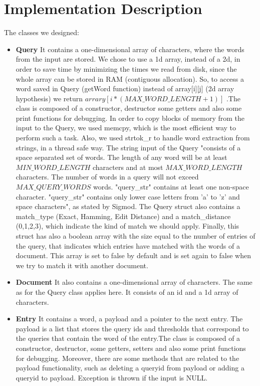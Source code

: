 \documentclass{article}
\begin{document}
\section{Implementation Description}
The classes we designed:
\begin{itemize}
  \item \textbf{Query}
  It contains a one-dimensional array of characters, where the words from the input are stored. We chose to use a 1d array, instead of a 2d, in order to save time by minimizing the times we read from disk, since the whole array can be stored in RAM (contiguous allocation). So, to access a word saved in Query (getWord function) instead of array[i][j] (2d array hypothesis) we return $arrary[i*(MAX\_WORD\_LENGTH + 1)]$ .The class is composed of a constructor, destructor some getters and also some print functions for debugging. In order to copy blocks of memory from the input to the Query, we used memcpy, which is the most efficient way to perform such a task. Also, we used strtok\_r to handle word extraction from strings, in a thread safe way. The string input of the Query "consists of a space separated set of words. The length of any word will be at least $MIN\_WORD\_LENGTH$ characters and at most $MAX\_WORD\_LENGTH$ characters. The number of words in a query will not exceed $MAX\_QUERY\_WORDS$ words. "query\_str" contains at least one non-space character. "query\_str" contains only lower case letters from 'a' to 'z' and space characters", as stated by Sigmod. The Query struct also contains a match\_type (Exact, Hamming, Edit Distance) and a match\_distance (0,1,2,3), which indicate the kind of match we should apply. Finally, this struct has also a boolean array with the size equal to the number of entries of the query, that indicates which entries have matched with the words of a document. This array is set to false by default and is set again to false when we try to match it with another document.
  \item \textbf{Document} 
  It also contains a one-dimensional array of characters. The same as for the Query class applies here. It consists of an id and a 1d array of characters.
  \item \textbf{Entry}
  It contains a word, a payload and a pointer to the next entry. The payload is a list that stores the query ids and thresholds that correspond to the queries that contain the word of the entry.The class is composed of a constructor, destructor, some getters, setters and also some print functions for debugging. Moreover, there are some methods that are related to the payload functionality, such as deleting a queryid from payload or adding a queryid to payload. Exception is thrown if the input is NULL.

\end{itemize}
\end{document}
